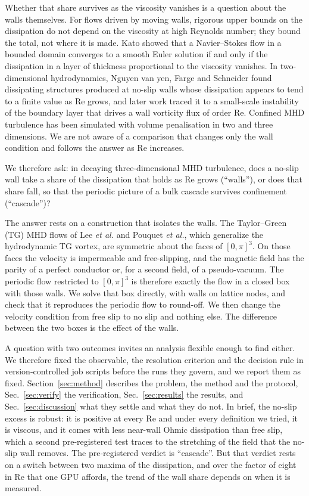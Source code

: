 \documentclass[aip,pop,reprint,amsmath,amssymb,superscriptaddress,floatfix]{revtex4-2}
\newcommand{\Rey}{\mathrm{Re}}
\begin{document}
Whether that share survives as the viscosity vanishes is a question about the walls
themselves. For flows driven by moving walls, rigorous upper bounds on the
dissipation do not depend on the viscosity at high Reynolds
number;\cite{doering1992} they bound the total, not where it is made. Kato showed
that a Navier--Stokes flow in a bounded domain converges to a smooth Euler solution
if and only if the dissipation in a layer of thickness proportional to the viscosity
vanishes.\cite{kato1984} In two-dimensional hydrodynamics, Nguyen van yen, Farge and
Schneider found dissipating structures produced at no-slip walls whose dissipation
appears to tend to a finite value as $\Rey$ grows,\cite{nguyen2011} and later work
traced it to a small-scale instability of the boundary layer that drives a wall
vorticity flux of order $\Rey$.\cite{nguyen2018} Confined MHD turbulence has been simulated with volume
penalisation in two\cite{neffaa2008} and three\cite{morales2014} dimensions. We are not
aware of a comparison that changes only the wall condition and follows the answer as
$\Rey$ increases.

We therefore ask: in decaying three-dimensional MHD turbulence, does a no-slip wall
take a share of the dissipation that holds as $\Rey$ grows (``walls''), or does that
share fall, so that the periodic picture of a bulk cascade survives confinement
(``cascade'')?

The answer rests on a construction that isolates the walls. The Taylor--Green (TG)
MHD flows of Lee \textit{et al.}\cite{lee2008} and Pouquet
\textit{et al.},\cite{pouquet2010} which generalize the hydrodynamic TG
vortex,\cite{brachet1983} are symmetric about the faces of $[0,\pi]^3$. On
those faces the velocity is impermeable and free-slipping, and the magnetic field has
the parity of a perfect conductor or, for a second field, of a pseudo-vacuum. The
periodic flow restricted to $[0,\pi]^3$ is therefore exactly the flow in a closed box
with those walls. We solve that box directly, with walls on lattice nodes, and check
that it reproduces the periodic flow to round-off. We then change the velocity
condition from free slip to no slip and nothing else. The difference between the two
boxes is the effect of the walls.

A question with two outcomes invites an analysis flexible enough to find either. We
therefore fixed the observable, the resolution criterion and the decision rule in
version-controlled job scripts before the runs they
govern,\cite{nosek2018,gelman2014} and we report them as fixed.
Section~\ref{sec:method} describes the problem, the method and the protocol,
Sec.~\ref{sec:verify} the verification, Sec.~\ref{sec:results} the results, and
Sec.~\ref{sec:discussion} what they settle and what they do not. In brief, the
no-slip excess is robust: it is positive at every $\Rey$ and under every definition
we tried, it is viscous, and it comes with less near-wall Ohmic dissipation than free
slip, which a second pre-registered test traces to the stretching of the field that
the no-slip wall removes. The pre-registered verdict is ``cascade''. But that verdict rests on a switch
between two maxima of the dissipation, and over the factor of eight in $\Rey$ that one
GPU affords, the trend of the wall share depends on when it is measured.
\end{document}
